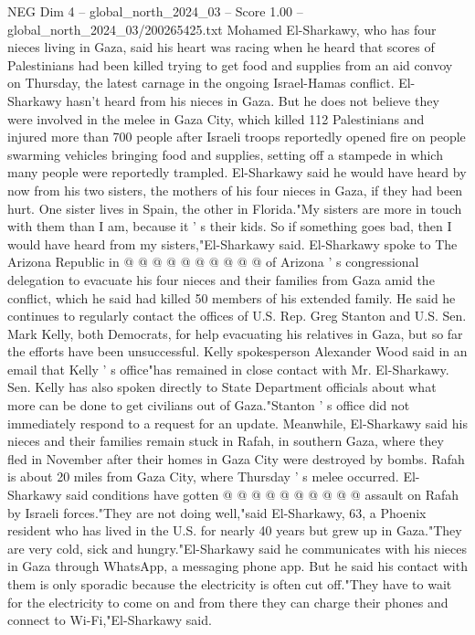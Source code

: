 \begin{textsample}{NEG Dim 4 – global\_north\_2024\_03 – Score 1.00 – global\_north\_2024\_03/200265425.txt}  \label{ex:f4_neg_227}
Mohamed El-Sharkawy, who has four nieces living in Gaza, said his heart was racing when he heard that scores of Palestinians had been killed trying to get food and supplies from an aid convoy on Thursday, the latest carnage in the ongoing Israel-Hamas conflict.
El-Sharkawy hasn't heard from his nieces in Gaza.
But he does not believe they were involved in the melee in Gaza City, which killed 112 Palestinians and injured more than 700 people after Israeli troops reportedly opened fire on people swarming vehicles bringing food and supplies, setting off a stampede in which many people were reportedly trampled.
El-Sharkawy said he would have heard by now from his two sisters, the mothers of his four nieces in Gaza, if they had been hurt.
One sister lives in Spain, the other in Florida."My sisters are more in touch with them than I am, because it ' s their kids.
So if something goes bad, then I would have heard from my sisters,"El-Sharkawy said.
El-Sharkawy spoke to The Arizona Republic in @ @ @ @ @ @ @ @ @ @ of Arizona ' s congressional delegation to evacuate his four nieces and their families from Gaza amid the conflict, which he said had killed 50 members of his extended family.
He said he continues to regularly contact the offices of U.S.
Rep.
Greg Stanton and U.S.
Sen.
Mark Kelly, both Democrats, for help evacuating his relatives in Gaza, but so far the efforts have been unsuccessful.
Kelly spokesperson Alexander Wood said in an email that Kelly ' s office"has remained in close contact with Mr.
El-Sharkawy.
Sen.
Kelly has also spoken directly to State Department officials about what more can be done to get civilians out of Gaza."Stanton ' s office did not immediately respond to a request for an update.
Meanwhile, El-Sharkawy said his nieces and their families remain stuck in Rafah, in southern Gaza, where they fled in November after their homes in Gaza City were destroyed by bombs.
Rafah is about 20 miles from Gaza City, where Thursday ' s melee occurred.
El-Sharkawy said conditions have gotten @ @ @ @ @ @ @ @ @ @ assault on Rafah by Israeli forces."They are not doing well,"said El-Sharkawy, 63, a Phoenix resident who has lived in the U.S. for nearly 40 years but grew up in Gaza."They are very cold, sick and hungry."El-Sharkawy said he communicates with his nieces in Gaza through WhatsApp, a messaging phone app.
But he said his contact with them is only sporadic because the electricity is often cut off."They have to wait for the electricity to come on and from there they can charge their phones and connect to Wi-Fi,"El-Sharkawy said.

\end{textsample}
